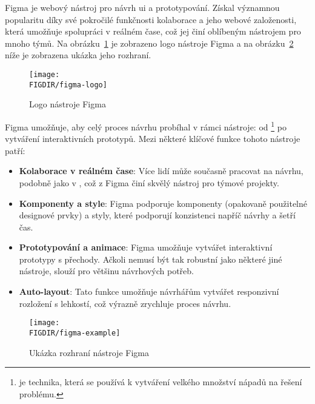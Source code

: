\begin{subsection}{Figma}
    \label{subsec:navrh-ui-nastroje-figma}
     je webový nástroj pro návrh \ac{ui} a prototypování.
    Získal významnou popularitu díky své pokročilé funkčnosti kolaborace a jeho webové založenosti, která umožňuje spolupráci v reálném čase, což jej činí oblíbeným nástrojem pro mnoho týmů\cite{w_industry_the_ultimate_battle_figma_vs_sketch_vs_adobe_xd}.
    Na obrázku~\ref{fig:figma-logo} je zobrazeno logo nástroje Figma a na obrázku~\ref{fig:figma-example} níže je zobrazena ukázka jeho rozhraní.

    \begin{figure}[H]
        \centering
        \caption{Logo nástroje Figma}
        \texttt{[image: \\FIGDIR/figma-logo]}
        \label{fig:figma-logo}
    \end{figure}

    Figma umožňuje, aby celý proces návrhu probíhal v rámci nástroje: od \footnote{ je technika, která se používá k vytváření velkého množství nápadů na řešení problému.} po vytváření interaktivních prototypů.
    Mezi některé klíčové funkce tohoto nástroje patří:

    \begin{itemize}
        \item \textbf{Kolaborace v reálném čase}: Více lidí může současně pracovat na návrhu, podobně jako v , což z Figma činí skvělý nástroj pro týmové projekty.
        \item \textbf{Komponenty a style}: Figma podporuje komponenty (opakovaně použitelné designové prvky) a styly, které podporují konzistenci napříč návrhy a šetří čas.
        \item \textbf{Prototypování a animace}: Figma umožňuje vytvářet interaktivní prototypy s přechody.
        Ačkoli nemusí být tak robustní jako některé jiné nástroje, slouží pro většinu návrhových potřeb.
        \item \textbf{Auto-layout}: Tato funkce umožňuje návrhářům vytvářet responzivní rozložení s lehkostí, což výrazně zrychluje proces návrhu.
    \end{itemize}

    \begin{figure}[H]
        \centering
        \caption{Ukázka rozhraní nástroje Figma}
        \texttt{[image: \\FIGDIR/figma-example]}
        \label{fig:figma-example}
    \end{figure}


\end{subsection}
